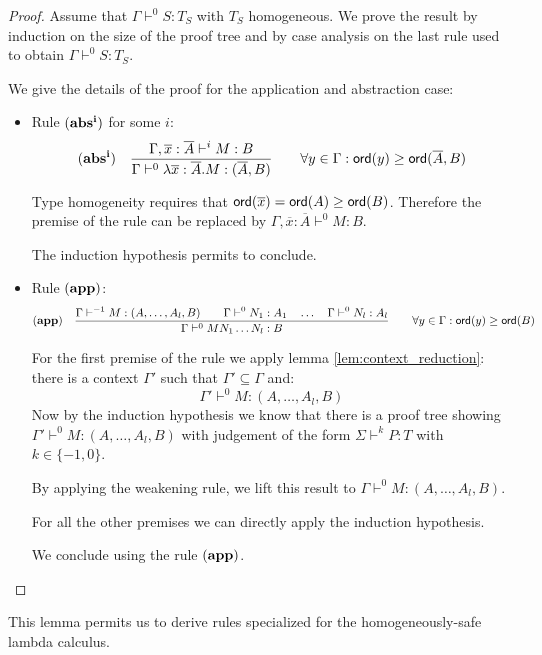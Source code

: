 \begin{proof}
Assume that $\Gamma \vdash^{0} S : T_S$ with $T_S$ homogeneous. We
prove the result by induction on the size of the proof tree and by
case analysis on the last rule used to obtain $\Gamma \vdash^{0} S :
T_S$.

We give the details of the proof for the application and abstraction
case:
\begin{itemize}
\item Rule $\mathbf{(abs^i)}$ for some $i$:
$$ \mathbf{(abs^i)} \quad  \frac{\displaystyle \Gamma, \overline{x} : \overline{A} \vdash^i M : B}{\Gamma  \vdash^{0} \lambda \overline{x} : \overline{A} . M : (\overline{A},B)} \qquad
                                   \forall y \in \Gamma : {\sf ord}(y) \geq {\sf ord}(\overline{A},B)$$

Type homogeneity requires that ${\sf ord}(\overline{x}) = {\sf ord}(A) \geq
{\sf ord}(B)$. Therefore the premise of the rule can be replaced by
$\Gamma, \overline{x} : \overline{A} \vdash^0 M : B$.

The induction hypothesis permits to conclude.

\item Rule $\mathbf{(app)}$:
$$ \mathbf{(app)} \quad  \frac{\displaystyle \Gamma \vdash^{-1} M : (A,\ldots,A_l,B)
                                        \qquad \Gamma \vdash^{0} N_1 : A_1
                                        \quad \ldots \quad \Gamma \vdash^{0} N_l : A_l  }{\Gamma  \vdash^0 M N_1 \ldots N_l : B}
                                    \qquad
                                   \forall y \in \Gamma : {\sf ord}(y) \geq {\sf ord}(B)$$

For the first premise of the rule we apply lemma
\ref{lem:context_reduction}: there is a context $\Gamma'$ such that
$\Gamma' \subseteq \Gamma$ and:
$$ \Gamma' \vdash^{0} M : (A,\ldots,A_l,B) $$
Now by the induction hypothesis we know that there is a proof tree
showing $\Gamma' \vdash^{0} M : (A,\ldots,A_l,B)$ with judgement of
the form $\Sigma \vdash^{k} P : T$ with $k\in \{-1,0\}$.

By applying the weakening rule, we lift this result to $\Gamma
\vdash^{0} M : (A,\ldots,A_l,B)$.

For all the other premises we can directly apply the induction
hypothesis.

We conclude using the rule $\mathbf{(app)}$.
\end{itemize}
\end{proof}

This lemma permits us to derive rules specialized for the
homogeneously-safe lambda calculus.

